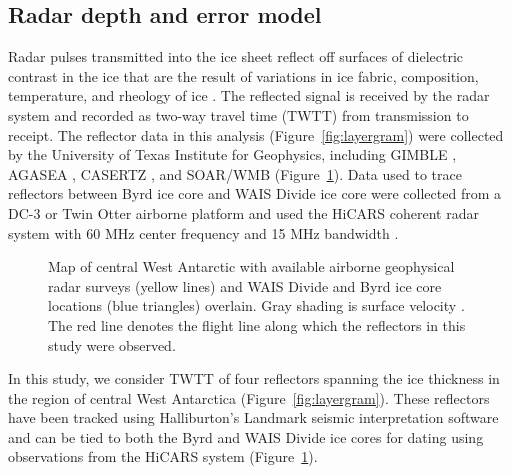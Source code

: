 


\subsection{Radar depth and error model}
 Radar pulses transmitted into the ice sheet reflect off surfaces of dielectric contrast in the ice that are the result of variations in ice fabric, composition, temperature, and rheology of ice \citep{fujita2000}. The reflected signal is received by the radar system and recorded as two-way travel time (TWTT) from transmission to receipt.  The reflector data in this analysis (Figure~\ref{fig:layergram}) were collected by the University of Texas Institute for Geophysics, including GIMBLE \citep{gimble2017}, AGASEA \citep{holt2006}, CASERTZ \citep{morse2002}, and SOAR/WMB \citep{luyendyk2003} (Figure~\ref{fig:radarmap}). Data used to trace reflectors between Byrd ice core and WAIS Divide ice core were collected from a DC-3 or Twin Otter airborne platform and used the HiCARS coherent radar system with 60 MHz center frequency and 15 MHz bandwidth \citep{peters2005}.%

\begin{figure}[h]
\centering
{}
\caption{Map of central West Antarctic with available airborne geophysical radar surveys (yellow lines) and  WAIS Divide and Byrd ice core locations (blue triangles) overlain. Gray shading is surface velocity \citep{rignot2011}. The red line denotes the flight line along which the reflectors in this study were observed. }
\label{fig:radarmap}
\end{figure}



In this study, we consider TWTT of four reflectors spanning the ice thickness in the region of central West Antarctica (Figure~\ref{fig:layergram}). These reflectors have been tracked using Halliburton's Landmark seismic interpretation software and can be tied to both the Byrd and WAIS Divide ice cores for dating using observations from the HiCARS system (Figure~\ref{fig:radarmap}). %

